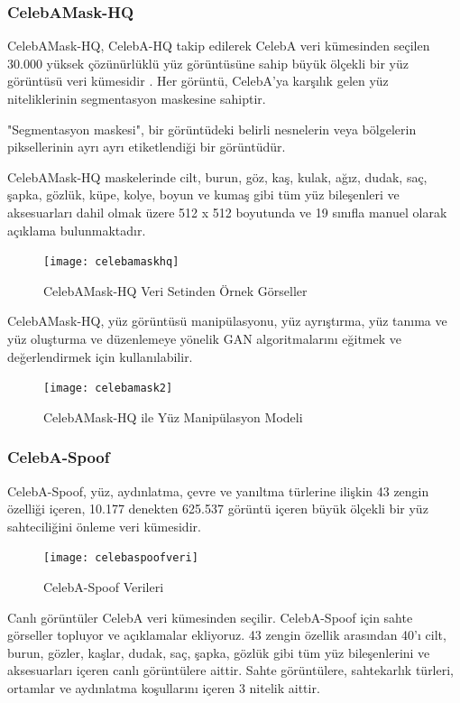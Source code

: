 \documentclass[12pt, a4paper]{article}
\begin{document}
	\subsubsection{CelebAMask-HQ}
	CelebAMask-HQ, CelebA-HQ takip edilerek CelebA veri kümesinden seçilen 30.000 yüksek çözünürlüklü yüz görüntüsüne sahip büyük ölçekli bir yüz görüntüsü veri kümesidir . Her görüntü, CelebA'ya karşılık gelen yüz niteliklerinin segmentasyon maskesine sahiptir.
	
	"Segmentasyon maskesi", bir görüntüdeki belirli nesnelerin veya bölgelerin piksellerinin ayrı ayrı etiketlendiği bir görüntüdür.
	
	CelebAMask-HQ maskelerinde cilt, burun, göz, kaş, kulak, ağız, dudak, saç, şapka, gözlük, küpe, kolye, boyun ve kumaş gibi tüm yüz bileşenleri ve aksesuarları dahil olmak üzere 512 x 512 boyutunda ve 19 sınıfla manuel olarak açıklama bulunmaktadır.
	
	\begin{figure}[h]
		\centering
		\texttt{[image: celebamaskhq]}
		\label{celebamaskhq}
		\caption{CelebAMask-HQ Veri Setinden Örnek Görseller\cite{CelebA-2024-04-04}}
	\end{figure}
		\FloatBarrier
	CelebAMask-HQ, yüz görüntüsü manipülasyonu, yüz ayrıştırma, yüz tanıma ve yüz oluşturma ve düzenlemeye yönelik GAN algoritmalarını eğitmek ve değerlendirmek için kullanılabilir.
	
	\begin{figure}[h]
		\centering
		\texttt{[image: celebamask2]}
		\label{celebamask2}
		\caption{CelebAMask-HQ ile Yüz Manipülasyon Modeli\cite{CelebA-2024-04-04}}
	\end{figure}
		\FloatBarrier
	\subsubsection{CelebA-Spoof}
	
	CelebA-Spoof, yüz, aydınlatma, çevre ve yanıltma türlerine ilişkin 43 zengin özelliği içeren, 10.177 denekten 625.537 görüntü içeren büyük ölçekli bir yüz sahteciliğini önleme veri kümesidir. 
	
	\begin{figure}[h]
		\centering
		\texttt{[image: celebaspoofveri]}
		\label{celebaspoofveri}
		\caption{ CelebA-Spoof Verileri\cite{CelebA-2024-04-04}}
	\end{figure}
		\FloatBarrier
	Canlı görüntüler CelebA veri kümesinden seçilir. CelebA-Spoof için sahte görseller topluyor ve açıklamalar ekliyoruz. 43 zengin özellik arasından 40'ı cilt, burun, gözler, kaşlar, dudak, saç, şapka, gözlük gibi tüm yüz bileşenlerini ve aksesuarları içeren canlı görüntülere aittir. Sahte görüntülere, sahtekarlık türleri, ortamlar ve aydınlatma koşullarını içeren 3 nitelik aittir.
	
\end{document}
